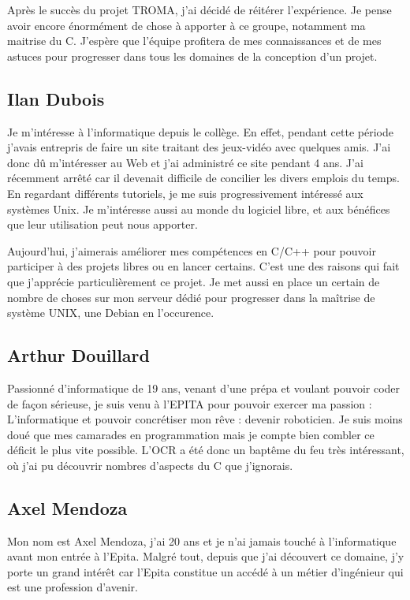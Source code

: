 \documentclass[11pt]{report}
\begin{document}
Après le succès du projet TROMA, j'ai décidé de réitérer l'expérience. Je pense avoir encore énormément de chose à apporter à ce groupe, notamment ma maitrise du C. J'espère que l'équipe profitera de mes connaissances et de mes astuces pour progresser dans tous les domaines de la conception d'un projet.

\subsection{Ilan Dubois}

Je m’intéresse à l’informatique depuis le collège. En effet, pendant cette période j’avais entrepris de faire un site traitant des jeux-vidéo avec quelques amis. J’ai donc dû m’intéresser au Web et j’ai administré ce site pendant 4 ans. J’ai récemment arrêté car il devenait difficile de concilier les divers emplois du temps. En regardant différents tutoriels, je me suis progressivement intéressé aux systèmes Unix. Je m’intéresse aussi au monde du logiciel libre, et aux bénéfices que leur utilisation peut nous apporter.

Aujourd'hui, j'aimerais améliorer mes compétences en C/C++ pour pouvoir participer à des projets libres ou en lancer certains. C'est une des raisons qui fait que j'apprécie particulièrement ce projet. Je met aussi en place un certain de nombre de choses sur mon serveur dédié pour progresser dans la maîtrise de système UNIX, une Debian en l'occurence.

\subsection{Arthur Douillard}

Passionné d’informatique de 19 ans, venant d’une prépa et voulant pouvoir coder de façon sérieuse, je suis venu à l’EPITA pour pouvoir exercer ma passion : L’informatique et pouvoir concrétiser mon rêve : devenir roboticien. Je suis moins doué que mes camarades en programmation mais je compte bien combler ce déficit le plus vite possible. L’OCR a été donc un baptême du feu très intéressant, où j’ai pu découvrir nombres d’aspects du C que j’ignorais.

\subsection{Axel Mendoza}

Mon nom est Axel Mendoza, j'ai 20 ans et je n'ai jamais touché à l'informatique avant mon entrée à l'Epita. Malgré tout, depuis que j'ai découvert ce domaine, j'y porte un grand intérêt car l'Epita constitue un accédé à un  métier d'ingénieur qui est une profession d'avenir. 
\end{document}
